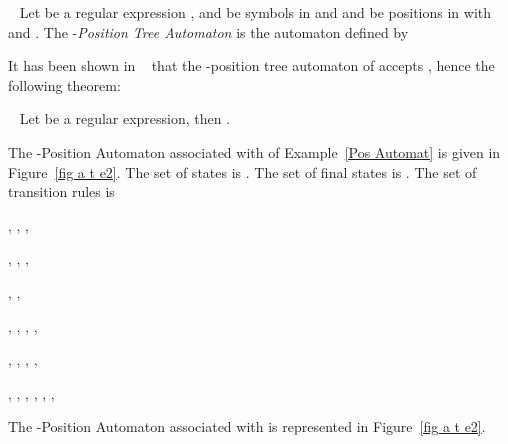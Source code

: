 \documentclass{llncs}
\begin{document}
  \begin{definition}\label{def aut pos}~\cite{arxiv}
    Let  be a regular expression ,  and  be symbols in  and  and  be positions in  with  and . The -\emph{Position Tree Automaton}  is the automaton  defined by 
       
\centerline{}       
       
      
  \end{definition}
  
  It has been shown in ~\cite{arxiv} that the -position tree automaton of  accepts , hence the following theorem:   

  
    \begin{theorem}\label{thm lang pe eq e}~\cite{arxiv}
     Let  be a regular expression, then .
  \end{theorem}
    
\begin{example}
The -Position Automaton  associated with  of Example~\ref{Pos Automat} is given in Figure~\ref{fig a t e2}.
The set of states is . The set of final states is . 
The set of transition rules  is 

\centerline{
    , , ,
}

\centerline{
    , , ,
}

\centerline{
    , ,
}

\centerline{
    , , , ,
}

\centerline{
    , , , ,
}

\centerline{
   , , , , , , 
}

The -Position Automaton  associated with  is represented in Figure~\ref{fig a t e2}.
\end{example}
\end{document}
